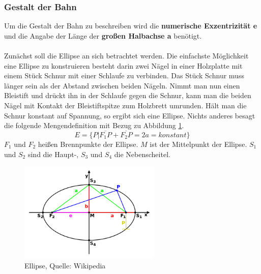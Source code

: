 \subsubsection*{Gestalt der Bahn}
Um die Gestalt der Bahn zu beschreiben wird die \textbf{numerische Exzentrizität e} und die Angabe der Länge der \textbf{großen Halbachse a} benötigt.
\\\\Zunächst soll die Ellipse an sich betrachtet werden. Die einfachste Möglichkeit eine Ellipse zu konstruieren besteht darin zwei Nägel in einer Holzplatte mit einem Stück Schnur mit einer Schlaufe zu verbinden. Das Stück Schnur muss länger sein als der Abstand zwischen beiden Nägeln. Nimmt man nun einen Bleistift und drückt ihn in der Schlaufe gegen die Schnur, kann man die beiden Nägel mit Kontakt der Bleistiftspitze zum Holzbrett umrunden. Hält man die Schnur konstant auf Spannung, so ergibt sich eine Ellipse. Nichts anderes besagt die folgende Mengendefinition mit Bezug zu Abbildung \ref{fig:ellipse}. 
\begin{equation}
E = \{P | \overline{F_{1}P} + \overline{F_{2}P} = 2a = konstant\}
\end{equation}
\ensuremath{F_{1}} und \ensuremath{F_{2}} heißen Brennpunkte der Ellipse. \ensuremath{M} ist der Mittelpunkt der Ellipse. \ensuremath{S_{1}} und \ensuremath{S_{2}} sind die Haupt-, \ensuremath{S_{3}} und \ensuremath{S_{4}} die Nebenscheitel.      
\begin{figure}[!htbp]                                                                       %
	\centering                                                                            	%
	\includegraphics[width=0.6\textwidth]{./images/ellipse.png}                             %
	\caption[Ellipse]{Ellipse, Quelle: Wikipedia}                                           %
	\label{fig:ellipse}                                                                     %
\end{figure}                                                                              	%
